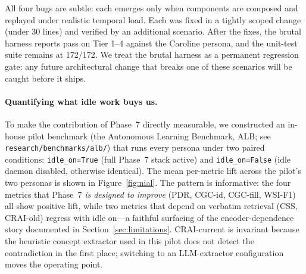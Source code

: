 \documentclass[11pt,twocolumn]{article}
\begin{document}
All four bugs are subtle: each emerges only when components are composed and replayed under realistic temporal load. Each was fixed in a tightly scoped change (under 30 lines) and verified by an additional scenario. After the fixes, the brutal harness reports pass on Tier 1--4 against the Caroline persona, and the unit-test suite remains at 172/172. We treat the brutal harness as a permanent regression gate: any future architectural change that breaks one of these scenarios will be caught before it ships.

\paragraph{Quantifying what idle work buys us.} To make the contribution of Phase~7 directly measurable, we constructed an in-house pilot benchmark (the Autonomous Learning Benchmark, ALB; see \texttt{research/benchmarks/alb/}) that runs every persona under two paired conditions: \texttt{idle\_on=True} (full Phase~7 stack active) and \texttt{idle\_on=False} (idle daemon disabled, otherwise identical). The mean per-metric lift across the pilot's two personas is shown in Figure~\ref{fig:nial}. The pattern is informative: the four metrics that Phase~7 \emph{is designed to improve} (PDR, CGC-id, CGC-fill, WSI-F1) all show positive lift, while two metrics that depend on verbatim retrieval (CSS, CRAI-old) regress with idle on---a faithful surfacing of the encoder-dependence story documented in Section~\ref{sec:limitations}. CRAI-current is invariant because the heuristic concept extractor used in this pilot does not detect the contradiction in the first place; switching to an LLM-extractor configuration moves the operating point.
\end{document}
